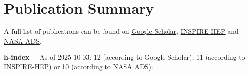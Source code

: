 \newcommand{\arxiv}[1]{[\href{http://arxiv.org/abs/#1}{arXiv:#1}]}
\def\zero{0}
\def\one{1}
\newcommand{\citeCount}[1]{%
    \def\val{#1}
    \ifx\val\zero%
    \else%
        \ifx\val\one%
        (1~citation)%
        \else%
        (#1~citations)%
        \fi%
    \fi
}


\def\apj{Astrophys.\ J.}
\def\apjs{Astrophys.\ J.\ Suppl.\ Ser.}
\def\cqg{Class.\ Quantum\ Gravity}
\def\joss{J.\ Open\ Source\ Softw.}
\def\mnras{Mon.\ Not.\ R.\ Astron.\ Soc.}
\def\prd{Phys.\ Rev.\ D}
\def\prl{Phys.\ Rev.\ Lett.}


\setcounter{numPubs}{24}
\setcounter{pubCounter}{\value{numPubs}}


\newif\ifshowpubsummary
\showpubsummarytrue
\ifshowpubsummary
\section{Publication Summary}

A full list of publications can be found on
\href{https://scholar.google.com/citations?hl=en&user=jET8KxgAAAAJ}%
{Google Scholar},
\href{https://inspirehep.net/authors/1798261}%
{INSPIRE-HEP}
and
\href{https://ui.adsabs.harvard.edu/user/libraries/SDMGXaKoRomaOJsefpo2yQ}%
{NASA ADS}.

\textbf{h-index---}%
As of 2025-10-03: 12 (according to Google Scholar),
11 (according to INSPIRE-HEP)
or 10 (according to NASA ADS).

